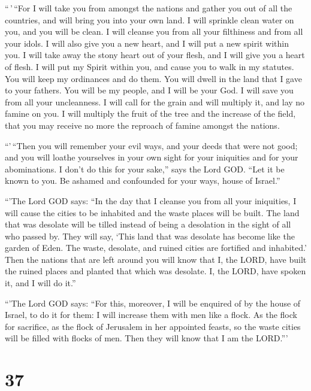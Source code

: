  ``\,'\,``For I will take you from amongst the nations
and gather you out of all the countries, and will bring you into your
own land.  I will sprinkle clean water on you, and you
will be clean. I will cleanse you from all your filthiness and from all
your idols.  I will also give you a new heart, and I will
put a new spirit within you. I will take away the stony heart out of
your flesh, and I will give you a heart of flesh.  I will
put my Spirit within you, and cause you to walk in my statutes. You will
keep my ordinances and do them.  You will dwell in the
land that I gave to your fathers. You will be my people, and I will be
your God.  I will save you from all your uncleanness. I
will call for the grain and will multiply it, and lay no famine on you.
 I will multiply the fruit of the tree and the increase
of the field, that you may receive no more the reproach of famine
amongst the nations.

 ``'\,``Then you will remember your evil ways, and your
deeds that were not good; and you will loathe yourselves in your own
sight for your iniquities and for your abominations.  I
don't do this for your sake,'' says the Lord GOD. ``Let it be known to
you. Be ashamed and confounded for your ways, house of Israel.''

 ``'The Lord GOD says: ``In the day that I cleanse you
from all your iniquities, I will cause the cities to be inhabited and
the waste places will be built.  The land that was
desolate will be tilled instead of being a desolation in the sight of
all who passed by.  They will say, `This land that was
desolate has become like the garden of Eden. The waste, desolate, and
ruined cities are fortified and inhabited.'  Then the
nations that are left around you will know that I, the LORD, have built
the ruined places and planted that which was desolate. I, the LORD, have
spoken it, and I will do it.''

 ``'The Lord GOD says: ``For this, moreover, I will be
enquired of by the house of Israel, to do it for them: I will increase
them with men like a flock.  As the flock for sacrifice,
as the flock of Jerusalem in her appointed feasts, so the waste cities
will be filled with flocks of men. Then they will know that I am the
LORD.'''

\hypertarget{section-35}{%
\section{37}\label{section-35}}

